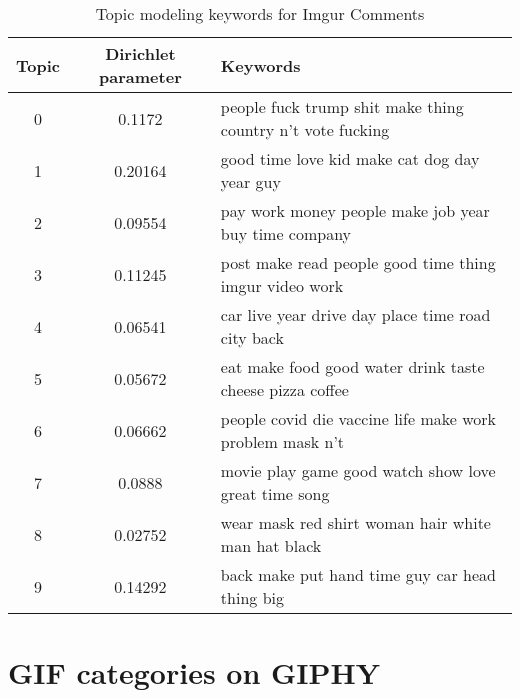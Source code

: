 \begin{table*}
\centering
\begin{tabular}{ccl}
\toprule \hline
\textbf{Topic} & \textbf{Dirichlet parameter} & \textbf{Keywords} \\
\midrule
0 & 0.1172 & people fuck trump shit make thing country n’t vote fucking \\ 
1 & 0.20164 & good time love kid make cat dog day year guy \\ 
2 & 0.09554 & pay work money people make job year buy time company \\ 
3 & 0.11245 & post make read people good time thing imgur video work \\ 
4 & 0.06541 & car live year drive day place time road city back \\ 
5 & 0.05672 & eat make food good water drink taste cheese pizza coffee \\ 
6 & 0.06662 & people covid die vaccine life make work problem mask n’t \\ 
7 & 0.0888 & movie play game good watch show love great time song \\ 
8 & 0.02752 & wear mask red shirt woman hair white man hat black \\ 
9 & 0.14292 & back make put hand time guy car head thing big \\
\hline
\bottomrule
\end{tabular}
\caption{Topic modeling keywords for Imgur Comments} 
\label{table:topic-model-keywords} 
\end{table*}


\section{GIF categories on GIPHY}
\label{appendix:GIFCategories}

